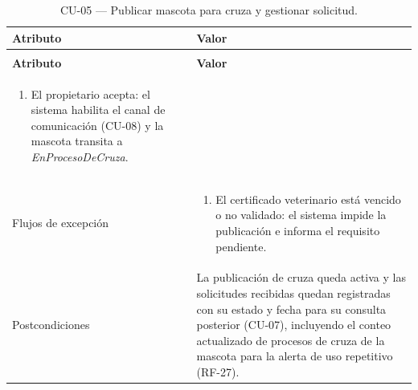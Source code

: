 \documentclass[journal,onecolumn]{IEEEtran}
\makeatletter
\newenvironment{atributos}[2]{%
	\small
	\begin{longtable}{@{}>{\raggedright\arraybackslash}p{4.2cm} >{\raggedright\arraybackslash}p{11.2cm}@{}}
		\caption{#2}\label{tab:#1}\\
		\toprule
		\textbf{Atributo} & \textbf{Valor} \\
		\midrule
		\endfirsthead
		\multicolumn{2}{@{}l}{\small\itshape (continuación)}\\
		\toprule
		\textbf{Atributo} & \textbf{Valor} \\
		\midrule
		\endhead
		\bottomrule
		\endlastfoot
	}{%
	\end{longtable}
	\normalsize
}
\makeatother
\begin{document}
\begin{atributos}{CU-05}{CU-05 --- Publicar mascota para cruza y gestionar solicitud.}
\begin{enumerate}[leftmargin=*, nosep]
			\item[8.1] El propietario acepta: el sistema habilita el canal de comunicación (CU-08) y la mascota transita a \emph{EnProcesoDeCruza}.
		\end{enumerate} \\
		Flujos de excepción &
		\begin{enumerate}[leftmargin=*, nosep]
			\item[3.1] El certificado veterinario está vencido o no validado: el sistema impide la publicación e informa el requisito pendiente.
		\end{enumerate} \\
		Postcondiciones & La publicación de cruza queda activa y las solicitudes recibidas quedan registradas con su estado y fecha para su consulta posterior (CU-07), incluyendo el conteo actualizado de procesos de cruza de la mascota para la alerta de uso repetitivo (RF-27). \\
	\end{atributos}
	
\end{document}
